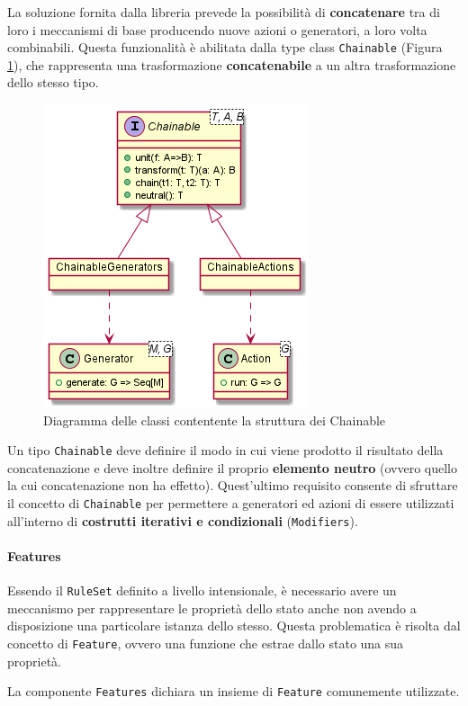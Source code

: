 La soluzione fornita dalla libreria prevede la possibilità di \textbf{concatenare} tra di loro i meccanismi di base producendo nuove azioni o generatori, a loro volta combinabili. %
%
Questa funzionalità è abilitata dalla type class \texttt{Chainable} (Figura \ref{fig:chainables}), che rappresenta una trasformazione \textbf{concatenabile} a un altra trasformazione dello stesso tipo. %
%
\begin{figure}
    \centering
    \includegraphics[width=0.5\linewidth]{images/uml/chainables.png}
    \caption{Diagramma delle classi contentente la struttura dei Chainable}
    \label{fig:chainables}
\end{figure}

Un tipo \texttt{Chainable} deve definire il modo in cui viene prodotto il risultato della concatenazione e deve inoltre definire il proprio \textbf{elemento neutro} (ovvero quello la cui concatenazione non ha effetto).
%
Quest'ultimo requisito consente di sfruttare il concetto di \texttt{Chainable} per permettere a generatori ed azioni di essere utilizzati all'interno di \textbf{costrutti iterativi e condizionali} (\texttt{Modifiers}).

\paragraph{Features}
Essendo il \texttt{RuleSet} definito a livello intensionale, è necessario avere un meccanismo per rappresentare le proprietà dello stato anche non avendo a disposizione una particolare istanza dello stesso.
%
Questa problematica è risolta dal concetto di \texttt{Feature}, ovvero una funzione che estrae dallo stato una sua proprietà.

La componente \texttt{Features} dichiara un insieme di \texttt{Feature} comunemente utilizzate.

